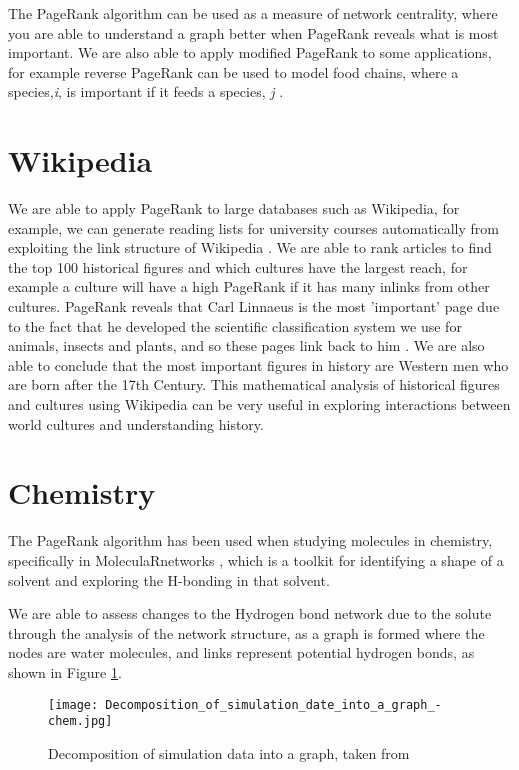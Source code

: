 \documentclass[11pt]{report}
\begin{document}
The PageRank algorithm can be used as a measure of network centrality, where you are able to understand a graph better when PageRank reveals what is most important. We are also able to apply modified PageRank to some applications, for example reverse PageRank can be used to model food chains, where a species,\textit{i}, is important if it feeds a species, \textit{j} \cite{allesina2009googling}. 

\section{Wikipedia} \label{sec:wiki}
We are able to apply PageRank to large databases such as Wikipedia, for example, we can generate reading lists for university courses automatically from exploiting the link structure of Wikipedia \cite{wissner2006preparation}. We are able to rank articles to find the top 100 historical figures and which cultures have the largest reach, for example a culture will have a high PageRank if it has many inlinks from other cultures. PageRank reveals that Carl Linnaeus is the most 'important' page due to the fact that he developed the scientific classification system we use for animals, insects and plants, and so these pages link back to him \cite{eom2015interactions}. We are also able to conclude that the most important figures in history are Western men who are born after the 17th Century. This mathematical analysis of historical figures and cultures using Wikipedia can be very useful in exploring interactions between world cultures and understanding history.

\section{Chemistry} \label{sec:chem}
The PageRank algorithm has been used when studying molecules in chemistry, specifically in MoleculaRnetworks \cite{JCC:JCC22917}, which is a toolkit for identifying a shape of a solvent and exploring the H-bonding in that solvent. 

We are able to assess changes to the Hydrogen bond network due to the solute through the analysis of the network structure, as a graph is formed where the nodes are water molecules, and links represent potential hydrogen bonds, as shown in Figure \ref{fig:chem}. 

\begin{figure}[h]
\texttt{[image: Decomposition\_of\_simulation\_date\_into\_a\_graph\_-chem.jpg]}
\caption{Decomposition of simulation data into a graph, taken from \cite{JCC:JCC22917}}
\label{fig:chem}
\end{figure}
\end{document}

